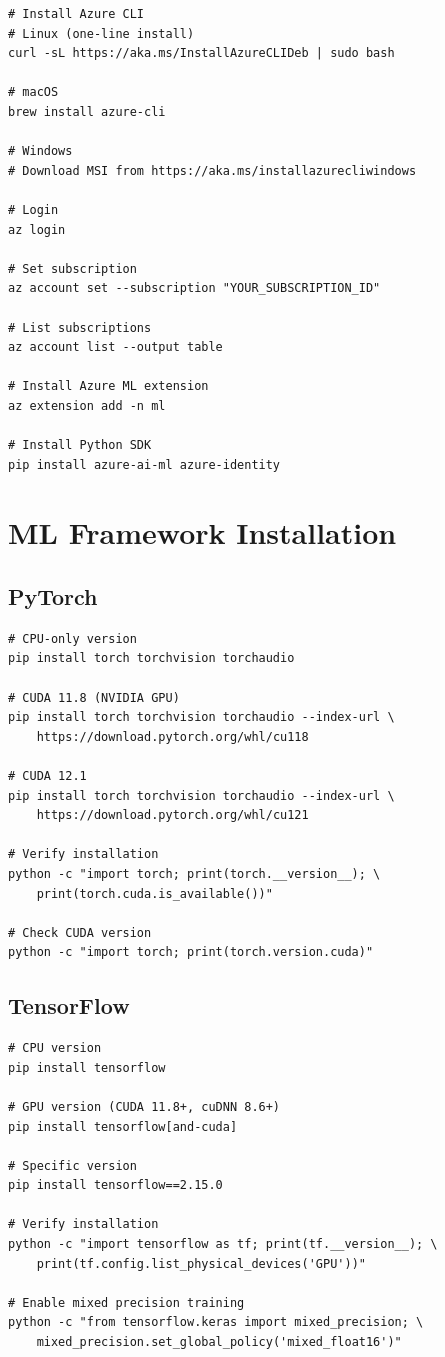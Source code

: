 \begin{lstlisting}[style=shell]
# Install Azure CLI
# Linux (one-line install)
curl -sL https://aka.ms/InstallAzureCLIDeb | sudo bash

# macOS
brew install azure-cli

# Windows
# Download MSI from https://aka.ms/installazurecliwindows

# Login
az login

# Set subscription
az account set --subscription "YOUR_SUBSCRIPTION_ID"

# List subscriptions
az account list --output table

# Install Azure ML extension
az extension add -n ml

# Install Python SDK
pip install azure-ai-ml azure-identity
\end{lstlisting}

\section{ML Framework Installation}

\subsection{PyTorch}

\begin{lstlisting}[style=shell]
# CPU-only version
pip install torch torchvision torchaudio

# CUDA 11.8 (NVIDIA GPU)
pip install torch torchvision torchaudio --index-url \
    https://download.pytorch.org/whl/cu118

# CUDA 12.1
pip install torch torchvision torchaudio --index-url \
    https://download.pytorch.org/whl/cu121

# Verify installation
python -c "import torch; print(torch.__version__); \
    print(torch.cuda.is_available())"

# Check CUDA version
python -c "import torch; print(torch.version.cuda)"
\end{lstlisting}

\subsection{TensorFlow}

\begin{lstlisting}[style=shell]
# CPU version
pip install tensorflow

# GPU version (CUDA 11.8+, cuDNN 8.6+)
pip install tensorflow[and-cuda]

# Specific version
pip install tensorflow==2.15.0

# Verify installation
python -c "import tensorflow as tf; print(tf.__version__); \
    print(tf.config.list_physical_devices('GPU'))"

# Enable mixed precision training
python -c "from tensorflow.keras import mixed_precision; \
    mixed_precision.set_global_policy('mixed_float16')"
\end{lstlisting}

